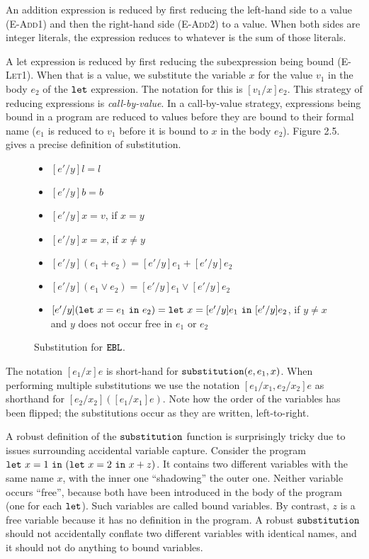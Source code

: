 An addition expression is reduced by first reducing the left-hand side to a value (\textsc{E-Add1}) and then the right-hand side (\textsc{E-Add2}) to a value. When both sides are integer literals, the expression reduces to whatever is the sum of those literals.

A let expression is reduced by first reducing the subexpression being bound (\textsc{E-Let1}). When that is a value, we substitute the variable $x$ for the value $v_1$ in the body $e_2$ of the $\mathtt{let}$ expression. The notation for this is $[v_1/x]e_2$. This strategy of reducing expressions is \textit{call-by-value}. In a call-by-value strategy, expressions being bound in a program are reduced to values before they are bound to their formal name ($e_1$ is reduced to $v_1$ before it is bound to $x$ in the body $e_2$). Figure 2.5. gives a precise definition of substitution.


\begin{figure}[h]


\begin{itemize}
	\setlength\itemsep{-0.7em}
	\item[] $[e'/y]l = l$
	\item[] $[e'/y]b = b$ 
	\item[] $[e'/y]x =  v$, if $x = y$
	\item[] $[e'/y]x = x$, if $x \neq y$
	\item[] $[e'/y](e_1 + e_2) = [e'/y]e_1 + [e'/y]e_2$
	\item[] $[e'/y](e_1 \lor e_2) = [e'/y]e_1 \lor [e'/y]e_2$
	\item[] $[e'/y](\mathtt{let}~ x = e_1~\mathtt{in}~ e_2) = \mathtt{let}~ x = [e'/y]e_1~\mathtt{in}~ [e'/y]e_2$, if $y \neq x$ and $y$ does not occur free in $e_1$ or $e_2$
\end{itemize}

\vspace{-12pt}
\caption{Substitution for $\mathtt{EBL}$.}
\label{This is the label.}
\end{figure}

The notation $[e_1/x]e$ is short-hand for $\mathtt{substitution}(e, e_1, x)$. When performing multiple substitutions we use the notation $[e_1/x_1, e_2/x_2] e$ as shorthand for $[e_2/x_2]([e_1/x_1] e)$. Note how the order of the variables has been flipped; the substitutions occur as they are written, left-to-right.

A robust definition of the $\mathtt{substitution}$ function is surprisingly tricky due to issues surrounding accidental variable capture. Consider the program $\mathtt{let}~ x = 1~\mathtt{in}~ (\mathtt{let}~ x = 2~\mathtt{in}~ x+z)$. It contains two different variables with the same name $x$, with the inner one ``shadowing'' the outer one. Neither variable occurs ``free'', because both have been introduced in the body of the program (one for each $\mathtt{let}$). Such variables are called bound variables. By contrast, $z$ is a free variable because it has no definition in the program. A robust $\mathtt{substitution}$ should not accidentally conflate two different variables with identical names, and it should not do anything to bound variables.

